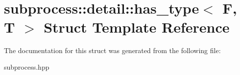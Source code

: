\hypertarget{structsubprocess_1_1detail_1_1has__type}{}\section{subprocess\+:\+:detail\+:\+:has\+\_\+type$<$ F, T $>$ Struct Template Reference}
\label{structsubprocess_1_1detail_1_1has__type}


The documentation for this struct was generated from the following file\+:\begin{DoxyCompactItemize}
\item 
subprocess.\+hpp\end{DoxyCompactItemize}
